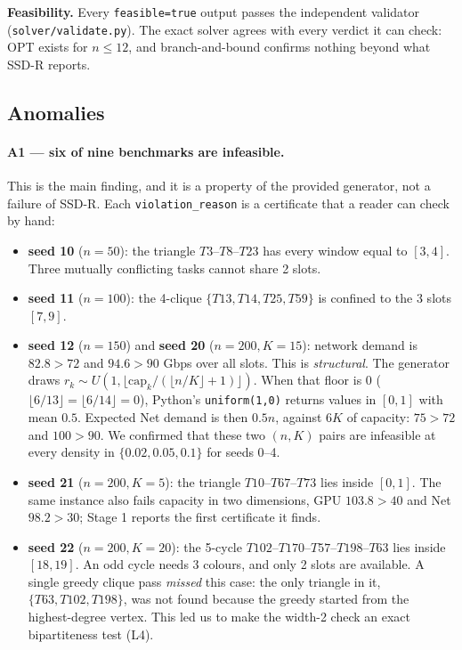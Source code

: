 \textbf{Feasibility.} Every \texttt{feasible=true} output passes the
independent validator (\texttt{solver/validate.py}). The exact solver
agrees with every verdict it can check: OPT exists for $n\le12$, and
branch-and-bound confirms nothing beyond what SSD-R reports.

\subsection{Anomalies}
\paragraph{A1 --- six of nine benchmarks are infeasible.}
This is the main finding, and it is a property of the provided generator,
not a failure of SSD-R. Each \texttt{violation\_reason} is a certificate
that a reader can check by hand:
\begin{itemize}
\item \textbf{seed 10} ($n{=}50$): the triangle $T3$--$T8$--$T23$ has every
  window equal to $[3,4]$. Three mutually conflicting tasks cannot share
  2 slots.
\item \textbf{seed 11} ($n{=}100$): the 4-clique $\{T13, T14, T25, T59\}$ is
  confined to the 3 slots $[7,9]$.
\item \textbf{seed 12} ($n{=}150$) and \textbf{seed 20} ($n{=}200, K{=}15$):
  network demand is $82.8 > 72$ and $94.6 > 90$ Gbps over all slots. This is
  \emph{structural}. The generator draws $r_k\sim U(1,\lfloor \text{cap}_k /
  (\lfloor n/K\rfloor+1)\rfloor)$. When that floor is 0
  ($\lfloor 6/13\rfloor = \lfloor 6/14\rfloor = 0$), Python's
  \texttt{uniform(1,0)} returns values in $[0,1]$ with mean $0.5$. Expected
  Net demand is then $0.5n$, against $6K$ of capacity: $75>72$ and
  $100>90$. We confirmed that these two $(n,K)$ pairs are infeasible at
  every density in $\{0.02, 0.05, 0.1\}$ for seeds 0--4.
\item \textbf{seed 21} ($n{=}200, K{=}5$): the triangle $T10$--$T67$--$T73$
  lies inside $[0,1]$. The same instance also fails capacity in two
  dimensions, GPU $103.8>40$ and Net $98.2>30$; Stage 1 reports the first
  certificate it finds.
\item \textbf{seed 22} ($n{=}200, K{=}20$): the 5-cycle
  $T102$--$T170$--$T57$--$T198$--$T63$ lies inside $[18,19]$. An odd cycle
  needs 3 colours, and only 2 slots are available. A single greedy clique
  pass \emph{missed} this case: the only triangle in it,
  $\{T63, T102, T198\}$, was not found because the greedy started from the
  highest-degree vertex. This led us to make the width-2 check an exact
  bipartiteness test (L4).
\end{itemize}

